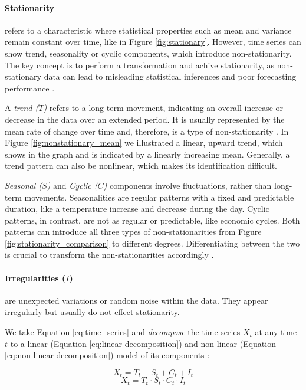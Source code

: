 

\paragraph{Stationarity} refers to a characteristic where statistical properties such as mean and variance remain constant over time, like in Figure \ref{fig:stationary}. 
However, time series can show trend, seasonality or cyclic components, which introduce non-stationarity. The key concept is to perform a transformation and achive stationarity, as non-stationary data can lead to misleading statistical inferences and poor forecasting performance \cite{Hamilton1989}. 

A \textit{trend ($T$)} refers to a long-term movement, indicating an overall increase or decrease in the data over an extended period. It is usually represented by the mean rate of change over time and, therefore, is a type of non-stationarity \cite{Vishwas2020}. In Figure \ref{fig:nonstationary_mean} we illustrated a linear, upward trend, which shows in the graph and is indicated by a linearly increasing mean. Generally, a trend pattern can also be nonlinear, which makes its identification difficult.

\textit{Seasonal ($S$)} and \textit{Cyclic ($C$)} components involve fluctuations, rather than long-term movements. Seasonalities are regular patterns with a fixed and predictable duration, like a temperature increase and decrease during the day. Cyclic patterns, in contrast, are not as regular or predictable, like economic cycles. Both patterns can introduce all three types of non-stationarities from Figure \ref{fig:stationarity_comparison} to different degrees. Differentiating between the two is crucial to transform the non-stationarities accordingly \cite{Box2013}. 

\paragraph{Irregularities ($I$)} are unexpected variations or random noise within the data. They appear irregularly but usually do not effect stationarity.

We take Equation \ref{eq:time_series} and \textit{decompose} the time series $X_t$ at any time $t$ to a linear (Equation \ref{eq:linear-decomposition}) and non-linear (Equation \ref{eq:non-linear-decomposition}) model of its components \cite{Vishwas2020}:

\begin{equation}
\label{eq:linear-decomposition}
    X_t = T_t + S_t + C_t + I_t
\end{equation}
\begin{equation}
\label{eq:non-linear-decomposition}
    X_t = T_t \cdot S_t \cdot C_t \cdot I_t
\end{equation}


